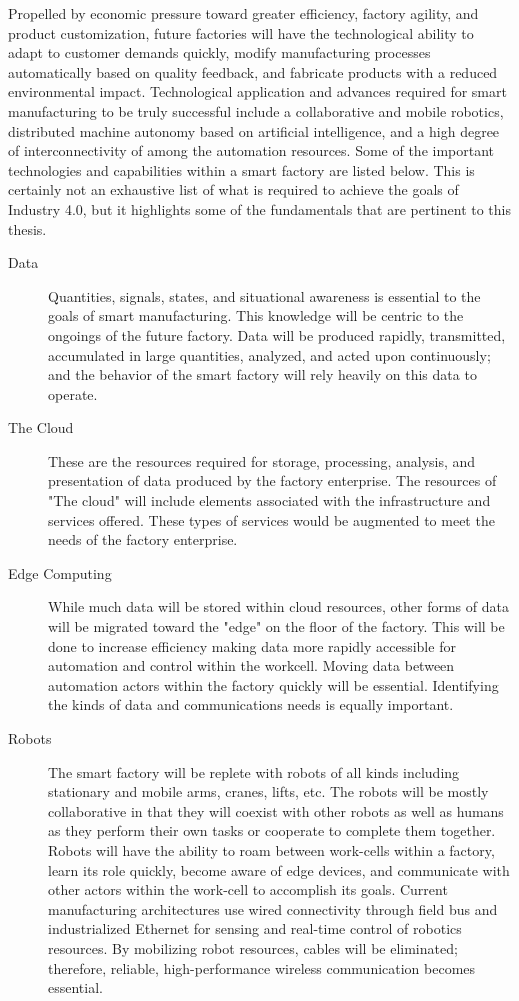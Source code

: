 {Propelled by economic pressure toward greater efficiency, factory agility, and product customization, future factories will have the technological ability to adapt to customer demands quickly, modify manufacturing processes automatically based on quality feedback, and fabricate products with a reduced environmental impact.  Technological application and advances required for smart manufacturing to be truly successful include a collaborative and mobile robotics, distributed machine autonomy based on artificial intelligence, and a high degree of interconnectivity of among the automation resources.  Some of the important technologies and capabilities within a smart factory are listed below.  This is certainly not an exhaustive list of what is required to achieve the goals of Industry 4.0, but it highlights some of the fundamentals that are pertinent to this thesis.

\begin{description}
	
	\item[Data] Quantities, signals, states, and situational awareness is essential to the goals of smart manufacturing. This knowledge will be centric to the ongoings of the future factory.  Data will be produced rapidly, transmitted, accumulated in large quantities, analyzed, and acted upon continuously; and the behavior of the smart factory will rely heavily on this data to operate. 
	 
	\item[The Cloud] These are the resources required for storage, processing, analysis, and presentation of data produced by the factory enterprise.  The resources of "The cloud" will include elements associated with the infrastructure and services offered.  These types of services would be augmented to meet the needs of the factory enterprise.
	
	\item[Edge Computing]  While much data will be stored within cloud resources, other forms of data will be migrated toward the "edge" on the floor of the factory.  This will be done to increase efficiency making data more rapidly accessible for automation and control within the workcell.  Moving data between automation actors within the factory quickly will be essential.  Identifying the kinds of data and communications needs is equally important.
	
	\item[Robots] The smart factory will be replete with robots of all kinds including stationary and mobile arms, cranes, lifts, etc.  The robots will be mostly collaborative in that they will coexist with other robots as well as humans as they perform their own tasks or cooperate to complete them together.  Robots will have the ability to roam between work-cells within a factory, learn its role quickly, become aware of edge devices, and communicate with other actors within the work-cell to accomplish its goals.  Current manufacturing architectures use wired connectivity through field bus and industrialized Ethernet for sensing and real-time control of robotics resources. By mobilizing robot resources, cables will be eliminated; therefore, reliable, high-performance wireless communication becomes essential.
	

\end{description}}
